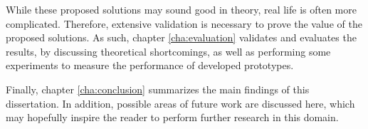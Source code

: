While these proposed solutions may sound good in theory, real life is often more complicated. Therefore, extensive validation is necessary to prove the value of the proposed solutions. As such, chapter \ref{cha:evaluation} validates and evaluates the results, by discussing theoretical shortcomings, as well as performing some experiments to measure the performance of developed prototypes. 

Finally, chapter \ref{cha:conclusion} summarizes the main findings of this dissertation. In addition, possible areas of future work are discussed here, which may hopefully inspire the reader to perform further research in this domain.
